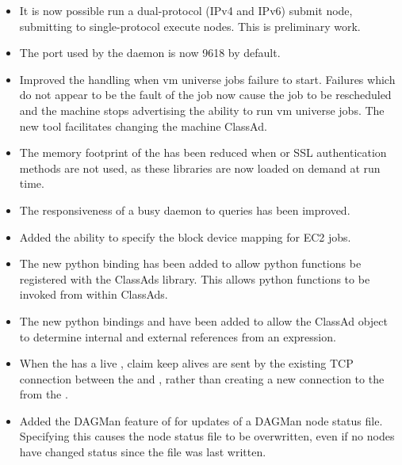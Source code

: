 \begin{itemize}

\item It is now possible run a dual-protocol (IPv4 and IPv6) submit node,
submitting to single-protocol execute nodes. This is preliminary work.

\item The port used by the  daemon is now
9618 by default.

\item Improved the handling when vm universe jobs failure to start.
Failures which do
not appear to be the fault of the job now cause the job to be rescheduled and
the machine stops advertising the ability to run vm universe jobs.
The new  tool facilitates changing
the machine ClassAd.

\item The memory footprint of the  has been
reduced when  or SSL authentication methods are not used, 
as these libraries are now loaded on demand at run time.

\item The responsiveness of a busy  daemon to queries
has been improved.

\item Added the ability to specify the block device mapping for EC2 jobs.

\item The new python binding  has been added 
to allow python functions
be registered with the ClassAds library.  This allows python
functions to be invoked from within ClassAds.

\item The new python bindings  and 
 have been added to allow the ClassAd object
to determine internal and external references from an expression.

\item When the  has a live , 
claim keep alives are sent
by the existing TCP connection between the  and ,
rather than creating a new connection to the 
 from the .

\item Added the DAGMan feature of  for updates
of a DAGMan node status file. 
Specifying this causes the node status file to be overwritten,
even if no nodes have changed status since the file was last written.


\end{itemize}
